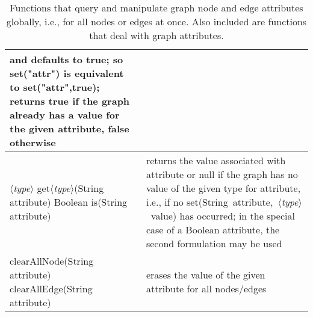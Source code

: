 \begin{table}
\begin{tabular}{| m{} | m{} |}
    and defaults to \textsf{true};
    so \textsf{set("attr")} is equivalent to \textsf{set("attr",true)};
    returns \textsf{true} if the graph already has a value for the given attribute,
    \textsf{false} otherwise
    \\ \hline
    \shortstack[l]{
    \textsf{$\langle$\emph{type}$\rangle$ get$\langle$\emph{type}$\rangle$(String attribute)}\\
    \textsf{Boolean is(String attribute)}
    }
    &
    returns the value associated with \textsf{attribute} or \textsf{null}
    if the graph has no value of the given type for \textsf{attribute}, i.e.,
    if no
    \textsf{set(String~attribute,~$\langle$\emph{type}$\rangle$~value)} has occurred;
    in the special case of a \textsf{Boolean} attribute, the second formulation
    may be used
    \\ \hline
    \shortstack[l]{
      \textsf{clearAllNode(String attribute)}\\
      \textsf{clearAllEdge(String attribute)}
    }
    &
    erases the value of the given attribute for all nodes/edges
    \\ \hline
  \end{tabular}

  \caption{Functions that query and manipulate graph
    node and edge attributes globally, i.e., for all nodes or edges
    at once. Also included are functions that deal with graph attributes.}
  \label{tab:graph_attribute_functions}
\end{table}

